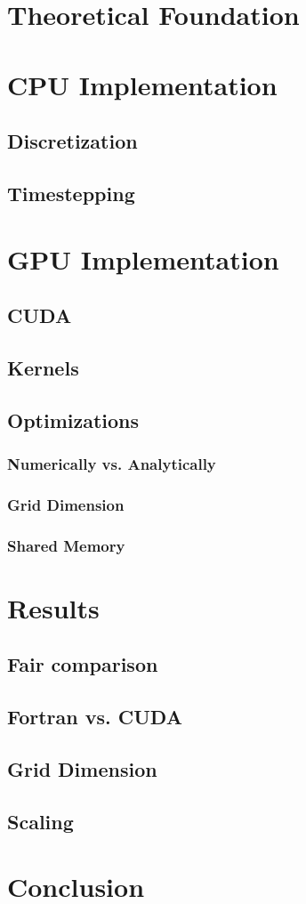\documentclass[a4paper,11pt]{kth-mag}
\begin{document}
\chapter{Theoretical Foundation}

\chapter{CPU Implementation}
\section{Discretization}
\section{Timestepping}

\chapter{GPU Implementation}
\section{CUDA}
\section{Kernels}
\section{Optimizations}
\subsection{Numerically vs. Analytically}
\subsection{Grid Dimension}
\subsection{Shared Memory}

\chapter{Results}
\section{Fair comparison}
\section{Fortran vs. CUDA}
\section{Grid Dimension}
\section{Scaling}

\chapter{Conclusion}

\appendix
\addappheadtotoc
\end{document}
